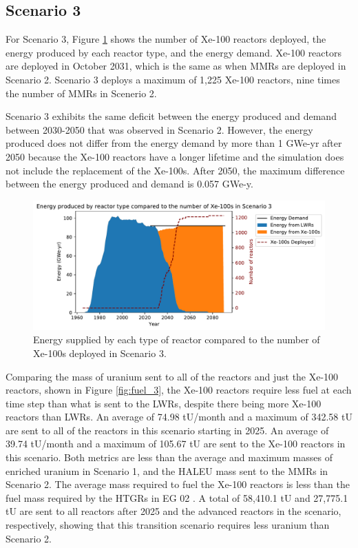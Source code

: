 \subsection{Scenario 3}
For Scenario 3, Figure \ref{fig:energy_rx_3} shows the number of Xe-100 
reactors deployed, the energy produced by each reactor type, and the 
energy demand. Xe-100 reactors are deployed in October 2031, which is the 
same as when \glspl{MMR}
are deployed in Scenario 2. Scenario 3 deploys a maximum of 1,225 Xe-100 
reactors, nine times the number of \glspl{MMR} in Scenerio 2.

Scenario 3 exhibits the same deficit between the energy produced and 
demand between 2030-2050 that was observed in Scenario 2. However, the 
energy produced does not differ from the energy demand by more than 1 GWe-yr 
after 2050 because the Xe-100 reactors have a longer lifetime and the 
simulation does not include the replacement of the Xe-100s. After 2050, the 
maximum difference between the energy produced and demand is 0.057 GWe-y. 

\begin{figure}
    \centering 
    \includegraphics[width=\textwidth]{../figures/energy_scenario3.pdf}
    \caption{Energy supplied by each type of reactor compared to the number of 
    Xe-100s deployed in Scenario 3.}
    \label{fig:energy_rx_3}
\end{figure}

Comparing the mass of uranium sent to all of the reactors and just the Xe-100 
reactors, shown in Figure \ref{fig:fuel_3}, the Xe-100 reactors 
require less fuel at each time step than what is sent to the \glspl{LWR}, 
despite there being more Xe-100 reactors than \glspl{LWR}. An average of 
74.98 tU/month and a maximum of 342.58 tU are sent to all of the reactors 
in this scenario starting in 2025. An average of 39.74 
tU/month and a maximum of 105.67 tU are sent to the Xe-100 reactors in 
this scenario. Both metrics are less than the 
average and maximum masses of enriched uranium  
in Scenario 1, and the \gls{HALEU} mass sent to the \glspl{MMR} in 
Scenario 2. The average mass required to fuel the Xe-100 reactors is less 
than the fuel mass required by the \glspl{HTGR} in \gls{EG} 02 
\cite{wigeland_nuclear_2014}. A total of 58,410.1 tU and 27,775.1 tU are sent to 
all reactors after 2025 and the advanced reactors in the scenario, respectively, 
showing
that this transition scenario requires less uranium than Scenario 2. 

